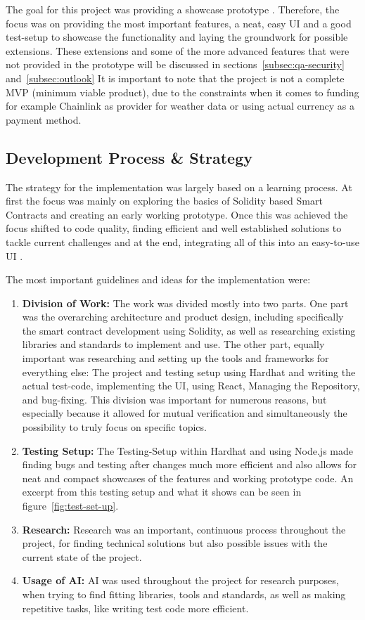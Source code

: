 \documentclass[11pt,a4paper]{article}
\begin{document}
		The goal for this project was providing a showcase prototype .
		Therefore, the focus was on providing the most important features, a neat, easy UI and a good test-setup to showcase the functionality and laying the groundwork for possible extensions.
		These extensions and some of the more advanced features that were not provided in the prototype will be discussed in sections~\ref{subsec:qa-security} and~\ref{subsec:outlook}
		It is important to note that the project is not a complete MVP (minimum viable product), due to the constraints when it comes to funding for example Chainlink as provider for weather data or using actual currency as a payment method.


		\subsection{Development Process \& Strategy}\label{subsec:dev-strategy}
		The strategy for the implementation was largely based on a learning process.
		At first the focus was mainly on exploring the basics of Solidity based Smart Contracts and creating an early working prototype.
		Once this was achieved the focus shifted to code quality, finding efficient and well established solutions to tackle current challenges and at the end, integrating all of this into an easy-to-use UI .


		The most important guidelines and ideas for the implementation were:

		\begin{enumerate}[1]
			\item \textbf{Division of Work:} The work was divided mostly into two parts.
				One part was the overarching architecture and product design, including specifically the smart contract development using Solidity, as well as researching existing libraries and standards to implement and use.
				The other part, equally important was researching and setting up the tools and frameworks for everything else: The project and testing setup using Hardhat and writing the actual test-code, implementing the UI, using React, Managing the Repository, and bug-fixing.
				This division was important for numerous reasons, but especially because it allowed for mutual verification and simultaneously the possibility to truly focus on specific topics.
			\item \textbf{Testing Setup:} The Testing-Setup within Hardhat and using Node.js made finding bugs and testing after changes much more efficient and also allows for neat and compact showcases of the features and working prototype code.
				An excerpt from this testing setup and what it shows can be seen in figure~\ref{fig:test-set-up}.
			\item \textbf{Research:} Research was an important, continuous process throughout the project, for finding technical solutions but also possible issues with the current state of the project.
			\item \textbf{Usage of AI:} AI was used throughout the project for research purposes, when trying to find fitting libraries, tools and standards, as well as making repetitive tasks, like writing test code more efficient.
		\end{enumerate}
\end{document}
